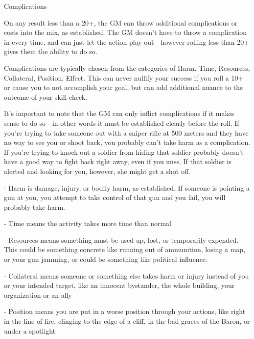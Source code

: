                                                  Complications  

On any result less than a 20+, the GM can throw additional complications or costs into the mix,  
as established. The GM doesn’t have to throw a complication in every time, and can just let the  
action play out - however rolling less than 20+ gives them the ability to do so.
 

Complications are typically chosen from the categories of Harm, Time, Resources, Collateral,  
Position, Effect. This can never nullify your success if you roll a 10+ or cause you to not  
accomplish your goal, but can add additional nuance to the outcome of your skill check. 
 

It’s important to note that the GM can only inflict complications if it makes sense to do so - in  
other words it must be established clearly before the roll. If you’re trying to take someone out  
with a sniper rifle at 500 meters and they have no way to see you or shoot back, you probably  
can’t take harm as a complication. If you’re trying to knock out a soldier from hiding that soldier  
probably doesn’t have a good way to fight back right away, even if you miss. If that soldier is  
alerted and looking for you, however, she might get a shot off.
 

    -    Harm is damage, injury, or bodily harm, as established. If someone is pointing a gun at  
         you, you attempt to take control of that gun and you fail, you will probably take harm.
 

                                                                                                                  


     -   Time means the activity takes more time than normal
 
     -   Resources means something must be used up, lost, or temporarily expended. This could  
         be something concrete like running out of ammunition, losing a map, or your gun  
         jamming, or could be something like political influence.
 
     -   Collateral means someone or something else takes harm or injury instead of you or your  
         intended target, like an innocent bystander, the whole building, your organization or an  
         ally
 
     -   Position means you are put in a worse position through your actions, like right in the line  
         of fire, clinging to the edge of a cliff, in the bad graces of the Baron, or under a spotlight
 
